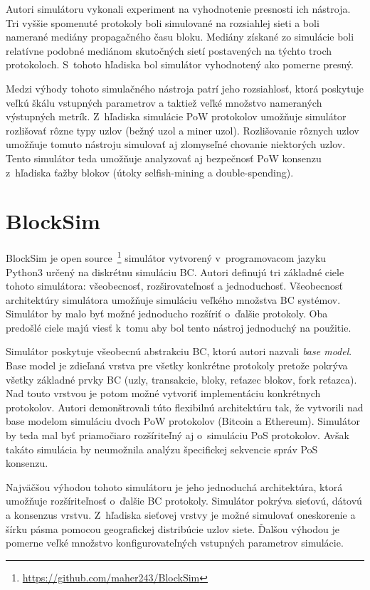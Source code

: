 Autori simulátoru vykonali experiment na vyhodnotenie presnosti ich nástroja. Tri vyššie spomenuté protokoly boli simulované na rozsiahlej sieti a boli namerané mediány propagačného času bloku. Mediány získané zo simulácie boli relatívne podobné mediánom skutočných sietí postavených na týchto troch protokoloch. S~tohoto hľadiska bol simulátor vyhodnotený ako pomerne presný.~\cite{btcSimulatorWp}

Medzi výhody tohoto simulačného nástroja patrí jeho rozsiahlosť, ktorá poskytuje veľkú škálu vstupných parametrov a taktiež veľké množstvo nameraných výstupných metrík. Z~hľadiska simulácie PoW protokolov umožňuje simulátor rozlišovať rôzne typy uzlov (bežný uzol a miner uzol). Rozlišovanie rôznych uzlov umožňuje tomuto nástroju simulovať aj zlomyseľné chovanie niektorých uzlov. Tento simulátor teda umožňuje analyzovať aj bezpečnosť PoW konsenzu z~hľadiska ťažby blokov (útoky selfish-mining a double-spending).~\cite{fanPerfEval}

\section{BlockSim}\label{sec:blocksim}

BlockSim je open source~\footnote{\url{https://github.com/maher243/BlockSim}} simulátor vytvorený v~programovacom jazyku Python3 určený na diskrétnu simuláciu BC. Autori definujú tri základné ciele tohoto simulátora: všeobecnosť, rozširovateľnosť a jednoduchosť. Všeobecnosť architektúry simulátora umožňuje simuláciu veľkého množstva BC systémov. Simulátor by malo byť možné jednoducho rozšíriť o~ďalšie protokoly. Oba predošlé ciele majú viesť k~tomu aby bol tento nástroj jednoduchý na použitie. 

Simulátor poskytuje všeobecnú abstrakciu BC, ktorú autori nazvali \textit{base model}. Base model je zdieľaná vrstva pre všetky konkrétne protokoly pretože pokrýva všetky základné prvky BC (uzly, transakcie, bloky, reťazec blokov, fork reťazca). Nad touto vrstvou je potom možné vytvoriť implementáciu konkrétnych protokolov. Autori demonštrovali túto flexibilnú architektúru tak, že vytvorili nad base modelom simuláciu dvoch PoW protokolov (Bitcoin a Ethereum). Simulátor by teda mal byť priamočiaro rozšíriteľný aj o~simuláciu PoS protokolov. Avšak takáto simulácia by neumožnila analýzu špecifickej sekvencie správ PoS konsenzu.~\cite{blocksimWp}	

Najväčšou výhodou tohoto simulátoru je jeho jednoduchá architektúra, ktorá umožňuje rozšíriteľnosť o~ďalšie BC protokoly. Simulátor pokrýva sieťovú, dátovú a konsenzus vrstvu. Z~hľadiska sieťovej vrstvy je možné simulovať oneskorenie a šírku pásma pomocou geografickej distribúcie uzlov siete. Ďalšou výhodou je pomerne veľké množstvo konfigurovateľných vstupných parametrov simulácie. 

